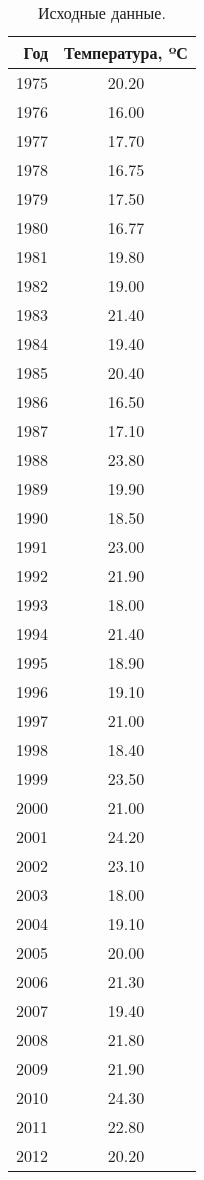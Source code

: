 \begin{table}[H]
\centering
\caption{Исходные данные.} 
\label{table:source}
\begin{tabular}{|rc|}
  \hline
Год & Температура, ºС \\ 
  \hline
1975 & 20.20 \\ 
  1976 & 16.00 \\ 
  1977 & 17.70 \\ 
  1978 & 16.75 \\ 
  1979 & 17.50 \\ 
  1980 & 16.77 \\ 
  1981 & 19.80 \\ 
  1982 & 19.00 \\ 
  1983 & 21.40 \\ 
  1984 & 19.40 \\ 
  1985 & 20.40 \\ 
  1986 & 16.50 \\ 
  1987 & 17.10 \\ 
  1988 & 23.80 \\ 
  1989 & 19.90 \\ 
  1990 & 18.50 \\ 
  1991 & 23.00 \\ 
  1992 & 21.90 \\ 
  1993 & 18.00 \\ 
  1994 & 21.40 \\ 
  1995 & 18.90 \\ 
  1996 & 19.10 \\ 
  1997 & 21.00 \\ 
  1998 & 18.40 \\ 
  1999 & 23.50 \\ 
  2000 & 21.00 \\ 
  2001 & 24.20 \\ 
  2002 & 23.10 \\ 
  2003 & 18.00 \\ 
  2004 & 19.10 \\ 
  2005 & 20.00 \\ 
  2006 & 21.30 \\ 
  2007 & 19.40 \\ 
  2008 & 21.80 \\ 
  2009 & 21.90 \\ 
  2010 & 24.30 \\ 
  2011 & 22.80 \\ 
  2012 & 20.20 \\ 
   \hline
\end{tabular}
\end{table}
